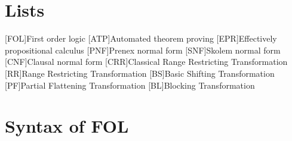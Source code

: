 \appendix
\renewcommand{\appendixtocname}{Appendix}
\renewcommand{\appendixpagename}{\appendixtocname}
\addappheadtotoc
{}
\appendixpage

\chapter{Lists}
\begin{acronym}[\hspace{3cm}]
  [FOL]{First order logic}
  [ATP]{Automated theorem proving}
  [EPR]{Effectively propositional calculus}
  [PNF]{Prenex normal form}
  [SNF]{Skolem normal form}
  [CNF]{Clausal normal form}
  [CRR]{Classical Range Restricting Transformation}
  [RR]{Range Restricting Transformation}
  [BS]{Basic Shifting Transformation}
  [PF]{Partial Flattening Transformation}
  [BL]{Blocking Transformation}
\end{acronym}
\clearpage

\listoffigures
{}

\listoftables
{}

\lstlistoflistings
{}


\chapter{Syntax of FOL}\label{chap:appendix_fol}
